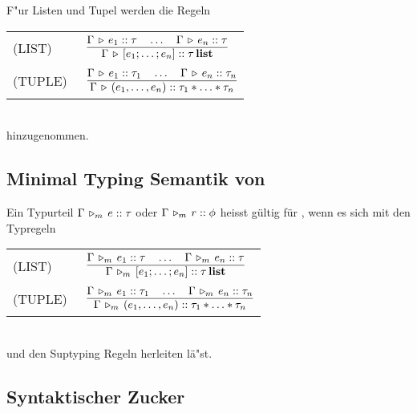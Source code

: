 F"ur Listen und Tupel werden die Regeln\\[3mm]
\begin{tabular}{ll}
  \mbox{(LIST)\ } & $\regel{\Tj{\Gamma}{e_1}{\tau} \quad \ldots \quad \Tj{\Gamma}{e_n}{\tau}}
                           {\Tj{\Gamma}{[e_1;\ldots;e_n]}{\listtype{\tau}}}$ \\[5mm]
  \mbox{(TUPLE)\ }& $\regel{\Tj{\Gamma}{e_1}{\tau_1} \quad \ldots \quad \Tj{\Gamma}{e_n}{\tau_n}}
                           {\Tj{\Gamma}{(e_1,\ldots,e_n)}{\tau_1 * \ldots * \tau_n}}$
\end{tabular}\\[7mm]
hinzugenommen.


\subsection{Minimal Typing Semantik von \LTHREE}

  Ein Typurteil $\Gamma\,\triangleright_m\,e\mathrel{::}\tau$ oder $\Gamma\,\triangleright_m\,r\mathrel{::}\phi$ heisst g\"ultig f\"ur \Lom,
  wenn es sich mit den  Typregeln \\[5mm]

     \begin{tabular}{ll}
  \mbox{(LIST)\ } & $\regel{\Tjm{\Gamma}{e_1}{\tau} \quad \ldots \quad \Tjm{\Gamma}{e_n}{\tau}}
                           {\Tjm{\Gamma}{[e_1;\ldots;e_n]}{\listtype{\tau}}}$ \\[5mm]
  \mbox{(TUPLE)\ }& $\regel{\Tjm{\Gamma}{e_1}{\tau_1} \quad \ldots \quad \Tjm{\Gamma}{e_n}{\tau_n}}
                           {\Tjm{\Gamma}{(e_1,\ldots,e_n)}{\tau_1 * \ldots * \tau_n}}$
  \end{tabular} \\[7mm]
  und den Suptyping Regeln herleiten l\"a"st.

\subsection{Syntaktischer Zucker}

